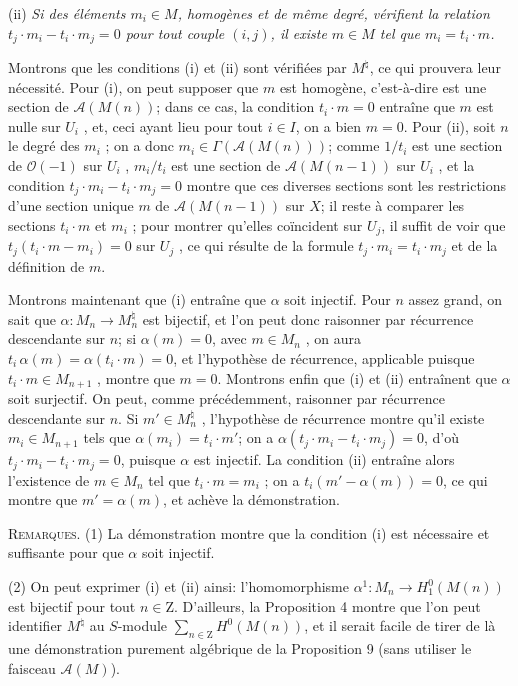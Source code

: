 (ii) \textit{Si des éléments $m_i \in M$, homogènes et de même degré, vérifient la relation $t_j\cdot m_i - t_i\cdot m_j = 0$ pour tout couple $(i, j)$, il existe $m \in M$ tel que $m_i = t_i\cdot m$.}

Montrons que les conditions (i) et (ii) sont vérifiées par $M^\natural$, ce qui prouvera leur nécessité. Pour (i), on peut supposer que $m$ est homogène, c'est-à-dire est une section de $\mathcal{A}(M(n))$; dans ce cas, la condition $t_i\cdot m = 0$ entraîne que $m$ est nulle sur $U_i$ , et, ceci ayant lieu pour tout $i \in I$, on a bien $m = 0$. Pour (ii), soit $n$ le degré des $m_i$ ; on a donc $m_i \in \Gamma(\mathcal{A}(M(n)))$; comme $1/t_i$ est une section de $\mathcal{O}(-1)$ sur $U_i$ , $m_i/t_i$ est une section de $\mathcal{A}(M(n - 1))$ sur $U_i$ , et la condition $t_j\cdot m_i - t_i\cdot m_j = 0$ montre que ces diverses sections sont les restrictions d'une section unique $m$ de $\mathcal{A}(M(n - 1))$ sur $X$; il reste à comparer les sections $t_i\cdot m$ et $m_i$ ; pour montrer qu'elles coïncident sur $U_j$, il suffit de voir que $t_j(t_i\cdot m - m_i) = 0$ sur $U_j$ , ce qui résulte de la formule $t_j\cdot m_i = t_i\cdot m_j$ et de la définition de $m$.

Montrons maintenant que (i) entraîne que $\alpha$ soit injectif. Pour $n$ assez grand, on sait que $\alpha : M_n \to M_n^\natural$ est bijectif, et l'on peut donc raisonner par récurrence descendante sur $n$; si $\alpha(m) = 0$, avec $m \in M_n$ , on aura $t_i\,\alpha(m) = \alpha(t_i\cdot m) = 0$, et l'hypothèse de récurrence, applicable puisque $t_i\cdot m \in M_{n+1}$ , montre que $m = 0$. Montrons enfin que (i) et (ii) entraînent que $\alpha$ soit surjectif. On peut, comme précédemment, raisonner par récurrence descendante sur $n$. Si $m' \in M_n^\natural$ , l'hypothèse de récurrence montre qu'il existe $m_i \in M_{n+1}$ tels que $\alpha(m_i) = t_i\cdot m'$; on a $\alpha(t_j\cdot m_i - t_i\cdot m_j) = 0$, d'où $t_j\cdot m_i - t_i\cdot m_j = 0$, puisque $\alpha$ est injectif. La condition (ii) entraîne alors l'existence de $m \in M_n$ tel que $t_i\cdot m = m_i$ ; on a $t_i(m' - \alpha(m)) = 0$, ce qui montre que $m' = \alpha(m)$, et achève la démonstration.

\textsc{Remarques}. (1) La démonstration montre que la condition (i) est nécessaire et suffisante pour que $\alpha$ soit injectif.

(2) On peut exprimer (i) et (ii) ainsi: l'homomorphisme $\alpha^1 : M_n \to H^0_1(M(n))$ est bijectif pour tout $n \in \mathrm{Z}$. D'ailleurs, la Proposition 4 montre que l'on peut identifier $M^\natural$ au $S$-module $\sum_{n \in \mathrm{Z}} H^0(M(n))$, et il serait facile de tirer de là
une démonstration purement algébrique de la Proposition 9 (sans utiliser le faisceau $\mathcal{A}(M)$).


